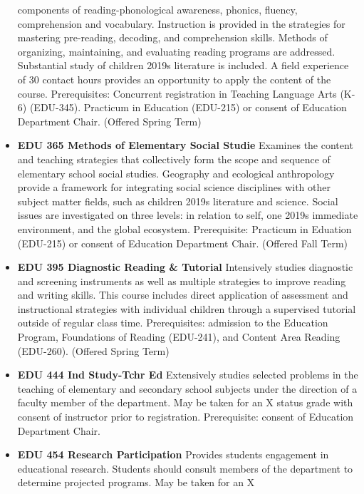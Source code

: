 \documentclass[
  letterpaper,
]{scrbook}
\begin{document}
\begin{itemize}
  components of reading-phonological awareness, phonics, fluency,
  comprehension and vocabulary. Instruction is provided in the
  strategies for mastering pre-reading, decoding, and comprehension
  skills. Methods of organizing, maintaining, and evaluating reading
  programs are addressed. Substantial study of children 2019s literature
  is included. A field experience of 30 contact hours provides an
  opportunity to apply the content of the course. Prerequisites:
  Concurrent registration in Teaching Language Arts (K-6) (EDU-345).
  Practicum in Education (EDU-215) or consent of Education Department
  Chair. (Offered Spring Term)\\
\item
  \textbf{EDU 365 Methods of Elementary Social Studie} Examines the
  content and teaching strategies that collectively form the scope and
  sequence of elementary school social studies. Geography and ecological
  anthropology provide a framework for integrating social science
  disciplines with other subject matter fields, such as children 2019s
  literature and science. Social issues are investigated on three
  levels: in relation to self, one 2019s immediate environment, and the
  global ecosystem. Prerequisite: Practicum in Eduation (EDU-215) or
  consent of Education Department Chair. (Offered Fall Term)\\
\item
  \textbf{EDU 395 Diagnostic Reading \& Tutorial} Intensively studies
  diagnostic and screening instruments as well as multiple strategies to
  improve reading and writing skills. This course includes direct
  application of assessment and instructional strategies with individual
  children through a supervised tutorial outside of regular class time.
  Prerequisites: admission to the Education Program, Foundations of
  Reading (EDU-241), and Content Area Reading (EDU-260). (Offered Spring
  Term)\\
\item
  \textbf{EDU 444 Ind Study-Tchr Ed} Extensively studies selected
  problems in the teaching of elementary and secondary school subjects
  under the direction of a faculty member of the department. May be
  taken for an X status grade with consent of instructor prior to
  registration. Prerequisite: consent of Education Department Chair.\\
\item
  \textbf{EDU 454 Research Participation} Provides students engagement
  in educational research. Students should consult members of the
  department to determine projected programs. May be taken for an X

\end{itemize}
\end{document}
